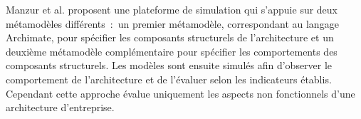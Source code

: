 Manzur et al. \cite{manzur2015xarchimate} proposent une plateforme de simulation qui s'appuie sur deux métamodèles différents~:~un premier métamodèle, correspondant au
langage Archimate, pour spécifier les composants structurels de l'architecture
et un deuxième métamodèle complémentaire pour spécifier les comportements des
composants structurels. Les modèles sont ensuite simulés afin d'observer le
comportement de l'architecture et de l'évaluer selon les indicateurs établis.
Cependant cette approche évalue uniquement les aspects non fonctionnels d'une
architecture d'entreprise.


